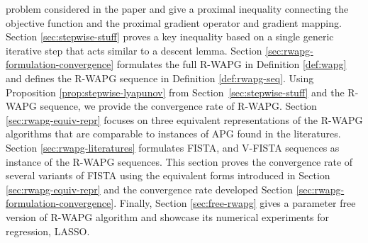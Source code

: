 \documentclass[12pt]{article}
\begin{document}
        problem considered in the paper and give a proximal inequality connecting the objective function
         and the proximal gradient
        operator and gradient mapping.
        Section \ref{sec:stepwise-stuff} proves 
        a key inequality based on a single generic iterative step that acts similar to a descent lemma.
        Section \ref{sec:rwapg-formulation-convergence} formulates the full R-WAPG in Definition \ref{def:wapg} and defines the R-WAPG sequence in Definition \ref{def:rwapg-seq}. Using Proposition \ref{prop:stepwise-lyapunov} from Section~\ref{sec:stepwise-stuff}
         and the R-WAPG sequence, 
        we provide the convergence rate of R-WAPG.
        Section \ref{sec:rwapg-equiv-repr} focuses on three equivalent representations of the R-WAPG algorithms that are comparable to instances of APG found in the literatures.
        Section \ref{sec:rwapg-literatures} formulates FISTA, and V-FISTA sequences as instance of the R-WAPG sequences.
        This section proves the convergence rate of several variants of FISTA using the equivalent forms introduced in Section \ref{sec:rwapg-equiv-repr} and the convergence rate developed Section \ref{sec:rwapg-formulation-convergence}.
        Finally, Section \ref{sec:free-rwapg} gives a parameter free version of R-WAPG algorithm and showcase its numerical experiments for regression, LASSO.
\end{document}
